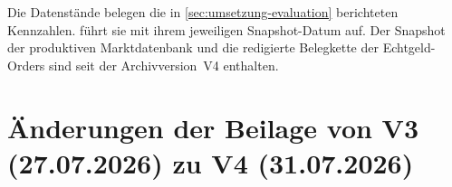 Die Datenstände belegen die in \cref{sec:umsetzung-evaluation} berichteten
Kennzahlen.  führt sie mit ihrem jeweiligen
Snapshot-Datum auf. Der Snapshot der
produktiven Marktdatenbank und die redigierte Belegkette der
Echtgeld-Orders sind seit der Archivversion~V4 enthalten.



%
\section{Änderungen der Beilage von V3 (27.07.2026) zu V4 (31.07.2026)}
\label{sec:anhang-archiv-changelog}

